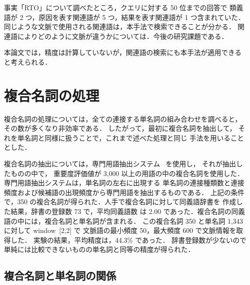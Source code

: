 \documentclass[japanese]{jnlp_1.4}
\begin{document}
\begin{table}[t]
\begin{center}
\label{rel}

\end{center}
\end{table}

事実「RTO」について調べたところ，クエリに対する 50 位までの回答で
類義語が 2 つ，原因を表す関連語が 5 つ，結果を表す関連語が 1 つ含まれていた．
同じような文脈で使用される関連語は，本手法で検索できることが分かる．
関連語によりどのように文脈が違うかについては．今後の研究課題である．

本論文では，精度は計算していないが，関連語の検索にも本手法が適用できる
と考えられる．



\section{複合名詞の処理}

複合名詞の処理については，全ての連接する単名詞の組み合わせを調べると，
その数が多くなり非効率である．
したがって，最初に複合名詞を抽出して，
それを単名詞と同様に扱うことで，これまで述べた処理と同じ
手法を用いることとした．

複合名詞の抽出については，専門用語抽出システム~\cite{termextract} を使用し，
それが抽出したものの中で，
重要度評価値が 3,000 以上の用語の中の複合名詞を使用した．専門用語抽出システムは，単名詞の左右に出現する
単名詞の連接種類数と連接頻度および候補語の出現頻度から専門用語を抽出するものである．
上記の条件で，350 の複合名詞が得られた．人手で複合名詞に対して同義語辞書を
作成した結果，辞書の登録数 73 で，平均同義語数
は 2.00 であった．複合名詞の同義語の中には，複合名詞と単名詞が含まれる．
この複合名詞 350 と単名詞 1,343 に対して window~[2,2] で
文脈語の最小頻度 50，最大頻度 600 で文脈情報を取得した．
実験の結果，平均精度は，44.3\% であった．
辞書登録数が少ないので単純には比較できないものの単名詞と同等の精度が得られた．


\subsection{複合名詞と単名詞の関係}
\end{document}
